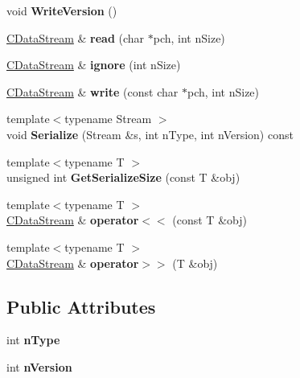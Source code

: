 \begin{DoxyCompactItemize}
void {\bfseries Write\+Version} ()
\item 
\mbox{\label{class_c_data_stream_a018f3ebc89837a806c3a26f89a86759e}} 
\mbox{\hyperlink{class_c_data_stream}{C\+Data\+Stream}} \& {\bfseries read} (char $\ast$pch, int n\+Size)
\item 
\mbox{\label{class_c_data_stream_aebfcaa009d328a208dbbcd13db846dd6}} 
\mbox{\hyperlink{class_c_data_stream}{C\+Data\+Stream}} \& {\bfseries ignore} (int n\+Size)
\item 
\mbox{\label{class_c_data_stream_a878b5fa69636a1f092d0b877dfdd31fc}} 
\mbox{\hyperlink{class_c_data_stream}{C\+Data\+Stream}} \& {\bfseries write} (const char $\ast$pch, int n\+Size)
\item 
\mbox{\label{class_c_data_stream_aea93472150507d03dff6dedda4a8208c}} 
{\footnotesize template$<$typename Stream $>$ }\\void {\bfseries Serialize} (Stream \&s, int n\+Type, int n\+Version) const
\item 
\mbox{\label{class_c_data_stream_aaf2b9e953793ce5a4fc438a7ecb00dc2}} 
{\footnotesize template$<$typename T $>$ }\\unsigned int {\bfseries Get\+Serialize\+Size} (const T \&obj)
\item 
\mbox{\label{class_c_data_stream_af47c6d4051064a226f529ee4d7c13ad7}} 
{\footnotesize template$<$typename T $>$ }\\\mbox{\hyperlink{class_c_data_stream}{C\+Data\+Stream}} \& {\bfseries operator$<$$<$} (const T \&obj)
\item 
\mbox{\label{class_c_data_stream_ac80cfc65569416f8c23e328edb4cadae}} 
{\footnotesize template$<$typename T $>$ }\\\mbox{\hyperlink{class_c_data_stream}{C\+Data\+Stream}} \& {\bfseries operator$>$$>$} (T \&obj)
\end{DoxyCompactItemize}
\subsection*{Public Attributes}
\begin{DoxyCompactItemize}
\item 
\mbox{\label{class_c_data_stream_a2b646679e24cf6f382fe8ab2d4f50f35}} 
int {\bfseries n\+Type}
\item 
\mbox{\label{class_c_data_stream_a074998c6b7c8aa17a1a90dbc414b605d}} 
int {\bfseries n\+Version}
\end{DoxyCompactItemize}
